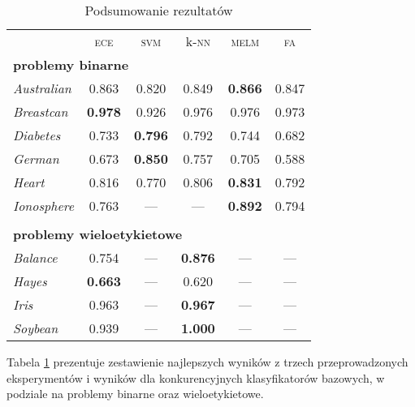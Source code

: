 \FloatBarrier
\begin{table}[ht]
	\caption{Podsumowanie rezultatów}
	\vspace{.5cm}
    \label{tab:podsumowanie}
	\centering
	\begin{tabular}{l>{\color{red}}ccccc}
		& \textsc{ece} & \textsc{svm} & k-\textsc{nn} & \textsc{melm} & \textsc{fa}\\
		\multicolumn{6}{l}{\tiny \bfseries problemy binarne}\\
		\emph{Australian} &0.863 & 0.820 & 0.849 & \textbf{0.866} & 0.847\\
		\emph{Breastcan} & \textbf{0.978} & 0.926 & 0.976 & 0.976 & 0.973\\
		\emph{Diabetes} & 0.733  & \textbf{0.796} & 0.792 & 0.744 & 0.682\\
		\emph{German} & 0.673 & \textbf{0.850} & 0.757 & 0.705 & 0.588\\
		\emph{Heart} & 0.816 & 0.770 & 0.806 & \textbf{0.831} & 0.792\\
		\emph{Ionosphere} & 0.763 & --- & --- & \textbf{0.892} & 0.794\\\\
		\multicolumn{6}{l}{\tiny \bfseries problemy wieloetykietowe}\\
		\emph{Balance} & 0.754 & --- & \textbf{0.876} & --- & ---\\		
		\emph{Hayes} & \textbf{0.663} & --- & 0.620 & --- & ---\\
		\emph{Iris} & 0.963 & --- & \textbf{0.967} & --- & ---\\
		\emph{Soybean} & 0.939 & --- & \textbf{1.000} & --- & ---\\
	\end{tabular}
\end{table}

Tabela \ref{tab:podsumowanie} prezentuje zestawienie najlepszych wyników z trzech przeprowadzonych eksperymentów i wyników dla konkurencyjnych klasyfikatorów bazowych, w podziale na problemy binarne oraz wieloetykietowe.